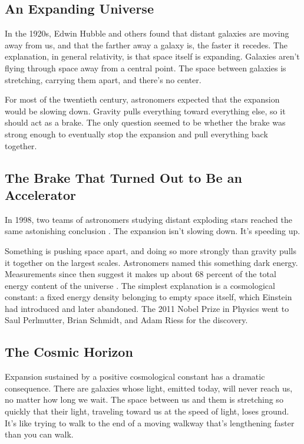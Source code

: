 \subsection{An Expanding Universe}

In the 1920s, Edwin Hubble and others found that distant galaxies are moving away from us, and that the farther away a galaxy is, the faster it recedes. The explanation, in general relativity, is that space itself is expanding. Galaxies aren't flying through space away from a central point. The space between galaxies is stretching, carrying them apart, and there's no center.

For most of the twentieth century, astronomers expected that the expansion would be slowing down. Gravity pulls everything toward everything else, so it should act as a brake. The only question seemed to be whether the brake was strong enough to eventually stop the expansion and pull everything back together.

\subsection{The Brake That Turned Out to Be an Accelerator}

In 1998, two teams of astronomers studying distant exploding stars reached the same astonishing conclusion \cite{riess1998,perlmutter1999}. The expansion isn't slowing down. It's speeding up.

Something is pushing space apart, and doing so more strongly than gravity pulls it together on the largest scales. Astronomers named this something dark energy. Measurements since then suggest it makes up about 68 percent of the total energy content of the universe \cite{planck2018}. The simplest explanation is a cosmological constant: a fixed energy density belonging to empty space itself, which Einstein had introduced and later abandoned. The 2011 Nobel Prize in Physics went to Saul Perlmutter, Brian Schmidt, and Adam Riess for the discovery.

\subsection{The Cosmic Horizon}

Expansion sustained by a positive cosmological constant has a dramatic consequence. There are galaxies whose light, emitted today, will never reach us, no matter how long we wait. The space between us and them is stretching so quickly that their light, traveling toward us at the speed of light, loses ground. It's like trying to walk to the end of a moving walkway that's lengthening faster than you can walk.

